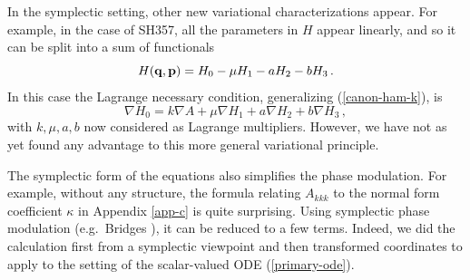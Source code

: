 \documentclass[10pt]{article}
\begin{document}
In the symplectic setting, other new variational characterizations appear.  For example, in the case of SH357, all the parameters in $H$ appear linearly, and so it can be split into a sum of   functionals
  \[
  H({\bf q},{\bf p}) = H_0 - \mu H_1 - a H_2 - b H_3\,.
  \]
  In this case the Lagrange
  necessary condition, generalizing (\ref{canon-ham-k}), is
  \[
  \nabla H_0 = k\nabla A + \mu \nabla H_1 + a\nabla H_2+b\nabla H_3\,,
  \]
  with $k,\mu,a,b$ now considered as Lagrange multipliers.  However, we have not
  as yet found any advantage to this more general variational principle.

    The symplectic form of the equations also
    simplifies the phase modulation.  For example, without any structure, the
    formula relating $A_{kkk}$ to the normal form coefficient $\kappa$ in Appendix \ref{app-c} is quite surprising. Using
    symplectic phase modulation (e.g.\ Bridges \cite{bridges2017symmetry}), it
    can be reduced to a few terms.  Indeed, we did the calculation first from a
    symplectic viewpoint and then transformed coordinates to apply to the setting of the scalar-valued ODE (\ref{primary-ode}).
    





\end{document}

